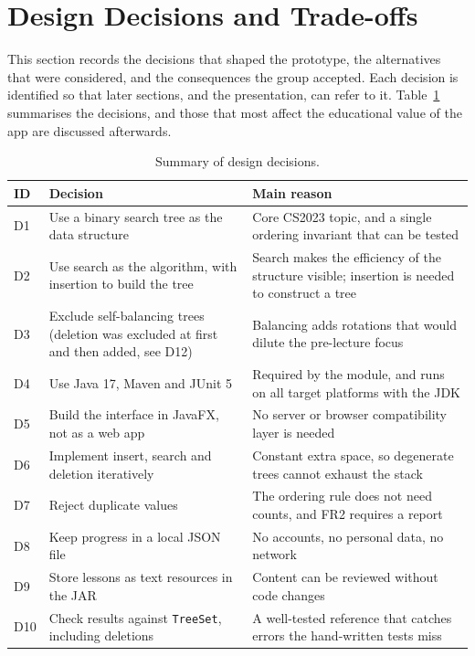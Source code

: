 \section{Design Decisions and Trade-offs}\label{sec:decisions}


This section records the decisions that shaped the prototype, the alternatives that were considered, and the consequences the group accepted. Each decision is identified so that later sections, and the presentation, can refer to it. Table~\ref{tab:decisions} summarises the decisions, and those that most affect the educational value of the app are discussed afterwards.

\begin{table}[H]
\centering
\small
\caption{Summary of design decisions.}
\label{tab:decisions}
\begin{tabularx}{\textwidth}{p{1.2cm} p{4.2cm} X}
\toprule
ID & Decision & Main reason \\
\midrule
D1 & Use a binary search tree as the data structure & Core CS2023 topic, and a single ordering invariant that can be tested \\
D2 & Use search as the algorithm, with insertion to build the tree & Search makes the efficiency of the structure visible; insertion is needed to construct a tree \\
D3 & Exclude self-balancing trees (deletion was excluded at first and then added, see D12) & Balancing adds rotations that would dilute the pre-lecture focus \\
D4 & Use Java 17, Maven and JUnit 5 & Required by the module, and runs on all target platforms with the JDK \\
D5 & Build the interface in JavaFX, not as a web app & No server or browser compatibility layer is needed \\
D6 & Implement insert, search and deletion iteratively & Constant extra space, so degenerate trees cannot exhaust the stack \\
D7 & Reject duplicate values & The ordering rule does not need counts, and FR2 requires a report \\
D8 & Keep progress in a local JSON file & No accounts, no personal data, no network \\
D9 & Store lessons as text resources in the JAR & Content can be reviewed without code changes \\
D10 & Check results against \texttt{TreeSet}, including deletions & A well-tested reference that catches errors the hand-written tests miss \\

\end{tabularx}
\end{table}
